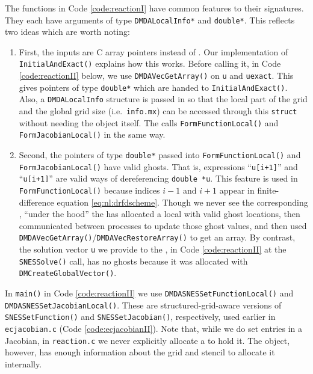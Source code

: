 The functions in Code \ref{code:reactionI} have common features to their signatures.  They each have arguments of type \texttt{DMDALocalInfo*} and \texttt{double*}.  This reflects two ideas which are worth noting:
\renewcommand{\labelenumi}{(\emph{\roman{enumi}})}
\begin{enumerate}
\item First, the inputs are C array pointers instead of \pVecs.  Our implementation of \texttt{InitialAndExact()} explains how this works.  Before calling it, in Code \ref{code:reactionII} below, we use \texttt{DMDAVecGetArray()} on \pVecs \texttt{u} and \texttt{uexact}.  This gives pointers of type \texttt{double*} which are handed to \texttt{InitialAndExact()}.  Also, a \texttt{DMDALocalInfo} structure is passed in so that the local part of the grid and the global grid size (i.e.~\texttt{info.mx}) can be accessed through this \texttt{struct} without needing the \pDMDA object itself.  The \pSNES calls \texttt{FormFunctionLocal()} and \texttt{FormJacobianLocal()} in the same way.
\item Second, the pointers of type \texttt{double*} passed into \texttt{FormFunctionLocal()} and \texttt{FormJacobianLocal()} have valid ghosts.  That is, expressions ``\texttt{u[i+1]}'' and ``\texttt{u[i+1]}'' are valid ways of dereferencing \texttt{double *u}.  This feature is used in \texttt{FormFunctionLocal()} because indices $i-1$ and $i+1$ appear in finite-difference equation \eqref{eq:nl:drfdscheme}.  Though we never see the corresponding \pVec, ``under the hood'' the \pSNES has allocated a local \pVec with valid ghost locations, then communicated between processes to update those ghost values, and then used \texttt{DMDAVecGetArray()}/\texttt{DMDAVecRestoreArray()} to get an array.  By contrast, the solution vector \texttt{u} we provide to the \pSNES, in Code \ref{code:reactionII} at the \texttt{SNESSolve()} call, has no ghosts because it was allocated with \texttt{DMCreateGlobalVector()}.
\end{enumerate}

In \texttt{main()} in Code \ref{code:reactionII} we use \texttt{DMDASNESSetFunctionLocal()} and  \texttt{DMDASNESSetJacobianLocal()}.  These are structured-grid-aware versions of \texttt{SNESSetFunction()} and \texttt{SNESSetJacobian()}, respectively, used earlier in \texttt{ecjacobian.c} (Code \ref{code:ecjacobianII}).  Note that, while we do set entries in a Jacobian, in \texttt{reaction.c} we never explicitly allocate a \pMat to hold it.  The \pDMDA object, however, has enough information about the grid and stencil to allocate it internally.

